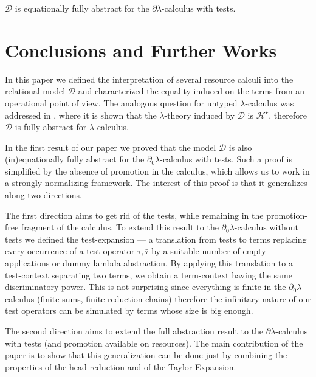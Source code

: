 \documentclass{LMCS}
\newcommand{\dlam}{\ensuremath{\partial\lambda}}
\newcommand{\dzlam}{\ensuremath{\partial_0\lambda}}
\newcommand{\lam}{\ensuremath{\lambda}}
\newcommand{\gt}{\ensuremath{\tau}}
\newcommand{\gto}{\ensuremath{\bar\tau}}
\newcommand{\cD}{\mathcal{D}}
\begin{document}
\begin{cor}
$\cD$ is equationally fully abstract for the \dlam-calculus with tests.
\end{cor}
 \section{Conclusions and Further Works} \label{sec:conclusions}

In this paper we defined the interpretation of several resource calculi into the relational model $\cD$
and characterized the equality induced on the terms from an operational point of view.
The analogous question for untyped \lam-calculus was addressed in \cite{Manzonetto09}, where it is shown that the \lam-theory induced by $\cD$ is $\mathcal{H}^\star$,
therefore $\cD$ is fully abstract for \lam-calculus.

In the first result of our paper we proved that the model $\cD$ is also (in)equationally fully abstract for the \dzlam-calculus with tests. 
Such a proof is simplified by the absence of promotion in the calculus, which allows us to work in a strongly normalizing framework.
The interest of this proof is that it generalizes along two directions.

The first direction aims to get rid of the tests, while remaining in the promotion-free fragment of the calculus.
To extend this result to the \dzlam-calculus without tests we defined the test-expansion --- a translation from tests to terms
replacing every occurrence of a test operator $\gt,\gto$ by a suitable number of empty applications or dummy lambda abstraction. 
By applying this translation to a test-context separating two terms, we obtain a term-context having the same discriminatory power.
This is not surprising since everything is finite in the \dzlam-calculus (finite sums, finite reduction chains) therefore the infinitary nature of 
our test operators can be simulated by terms whose size is big enough.

The second direction aims to extend the full abstraction result to the \dlam-calculus with tests (and promotion available on resources).
The main contribution of the paper is to show that this generalization can be done just by combining the properties of the
head reduction and of the Taylor Expansion.
\end{document}
